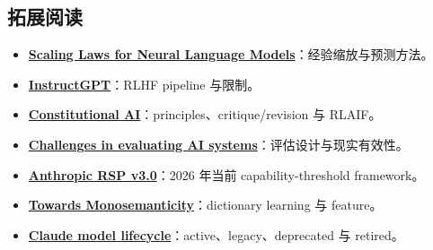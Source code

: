 \subsection{拓展阅读}

{\small
\begin{itemize}[nosep,leftmargin=*]
  \item \href{https://arxiv.org/abs/2001.08361}{\textbf{Scaling Laws for Neural Language Models}}：经验缩放与预测方法。
  \item \href{https://arxiv.org/abs/2203.02155}{\textbf{InstructGPT}}：RLHF pipeline 与限制。
  \item \href{https://www.anthropic.com/research/constitutional-ai-harmlessness-from-ai-feedback}{\textbf{Constitutional AI}}：principles、critique/revision 与 RLAIF。
  \item \href{https://www.anthropic.com/research/evaluating-ai-systems}{\textbf{Challenges in evaluating AI systems}}：评估设计与现实有效性。
  \item \href{https://www.anthropic.com/responsible-scaling-policy/rsp-v3-0}{\textbf{Anthropic RSP v3.0}}：2026 年当前 capability-threshold framework。
  \item \href{https://www.anthropic.com/research/towards-monosemanticity-decomposing-language-models-with-dictionary-learning}{\textbf{Towards Monosemanticity}}：dictionary learning 与 feature。
  \item \href{https://docs.anthropic.com/en/docs/about-claude/model-deprecations}{\textbf{Claude model lifecycle}}：active、legacy、deprecated 与 retired。
\end{itemize}
}


